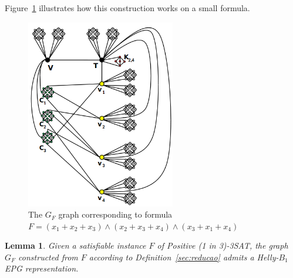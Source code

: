 \documentclass[
submission
]{dmtcs-episciences}
\newtheorem{lemma}[theorem]{Lemma}
\begin{document}
Figure~\ref{fig:exemploGrafoGF} illustrates how this construction works on a small formula. %

%
\begin{figure}[htb]	
\center%
\includegraphics[width=6.5cm]{exemploGrafoGFSBPO4}
\caption{The $G_{F}$ graph corresponding to formula $F=(x_1+ x_2+ x_3) \wedge  (x_2+ x_3+ x_4 )\wedge  (x_3 + x_1 + x_4 )$}
\label{fig:exemploGrafoGF}
\end{figure}


\begin{lemma}\label{lem:ida}
Given a satisfiable instance $F$ of {\sc Positive (1 in 3)-3SAT}, the graph $G_F$ constructed from $F$ according to Definition~\ref{sec:reducao} admits a Helly-$B_1$ EPG representation.
\end{lemma}





% 

\end{document}
